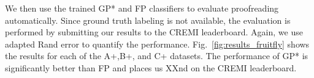 We then use the trained GP* and FP classifiers to evaluate proofreading automatically. Since ground truth labeling is not available, the evaluation is performed by submitting our results to the CREMI leaderboard. Again, we use adapted Rand error to quantify the performance. Fig.~\ref{fig:results_fruitfly} shows the results for each of the A+,B+, and C+ datasets. The performance of GP* is significantly better than FP and places us XXnd on the CREMI leaderboard.

